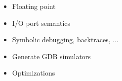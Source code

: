 \begin{block}{\large {}}
    \begin{itemize}
        \item Floating point        \\
        \item I/O port semantics    \\
        \item Symbolic debugging, backtraces, ... \\
        \item Generate GDB simulators \\
        \item Optimizations \\
    \end{itemize}
\end{block}
